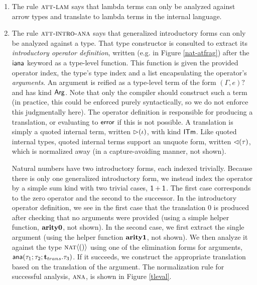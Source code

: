 \documentclass[10pt,preprint]{sigplanconf}
\begin{document}
{\begin{enumerate}
To do so, however, we must also translate the type itself so that an appropriate type annotation for the function argument can be emitted. Every type has an internal type associated with it called its \emph{representation type}. The type-level operator $\FF{repof}(\tau)$ evaluates to a \emph{quoted internal type}, $\titype{\sigma}$ (of kind $\kIType$), where $\sigma$ is the representation type of $\tau$. Type constructors define the representation type for every possible index by providing a type-level function called the \emph{representation schema}, written after the keyword $\FF{rep}$. The normalization rule showing this is given in Fig. \ref{tleval}. In our example, the representation schema is simple: natural numbers translate to integers. We will see an example where this is less trivial later. Note that quoted internal types support splicing using the $\dup{\tau}$ form. These forms are eliminated during normalization.
\item The rule $\textsc{att-lam}$ says that lambda terms can only be analyzed against arrow types and translate to lambda terms in the internal language.
\item The rule $\textsc{att-intro-ana}$ says that generalized introductory forms can only be analyzed against a type. That type constructor is consulted to extract its \emph{introductory operator definition}, written (e.g. in Figure \ref{nat-atfrag}) after the ${\sf iana}$ keyword as a type-level function. This function is given the provided operator index, the type's type index and a list encapsulating the operator's  \emph{arguments}. An argument is reified as a type-level term of the form $(\Gamma, e)?$ and has kind ${\sf Arg}$. Note that only the compiler should construct such a term (in practice, this could be enforced purely syntactically, so we do not enforce this judgmentally here). The operator definition is responsible for producing a translation, or evaluating to ${\sf error}$ if this is not possible. A translation is simply a quoted internal term, written $\rhd(\iota)$, with kind $\textsf{ITm}$. Like quoted internal types, quoted internal terms support an unquote form, written ${\lhd}(\tau)$, which is normalized away (in a capture-avoiding manner, not shown).

Natural numbers have two introductory forms, each indexed trivially. Because there is only one generalized introductory form, we instead index the operator by a simple sum kind with two trivial cases, $\textsf{1} + \textsf{1}$. The first case corresponds to the zero operator and the second to the successor. In the introductory operator definition, we see in the first case that the translation $0$ is produced after checking that no arguments were provided (using a simple helper function, ${\textbf{arity0}}$, not shown). In the second case, we first extract the single argument (using the helper function ${\textbf{arity1}}$, not shown). We then analyze it against the type $\textsc{nat}\langle()\rangle$ using one of the elimination forms for arguments, ${\sf ana}(\tau_1; \tau_2; {\textbf{t}}_{trans}.\tau_3)$. If it succeeds, we construct the appropriate translation based on the translation of the argument. The normalization rule for successful analysis, $\textsc{ana}$, is shown in Figure \ref{tleval}. 


\end{enumerate}}
\end{document}
